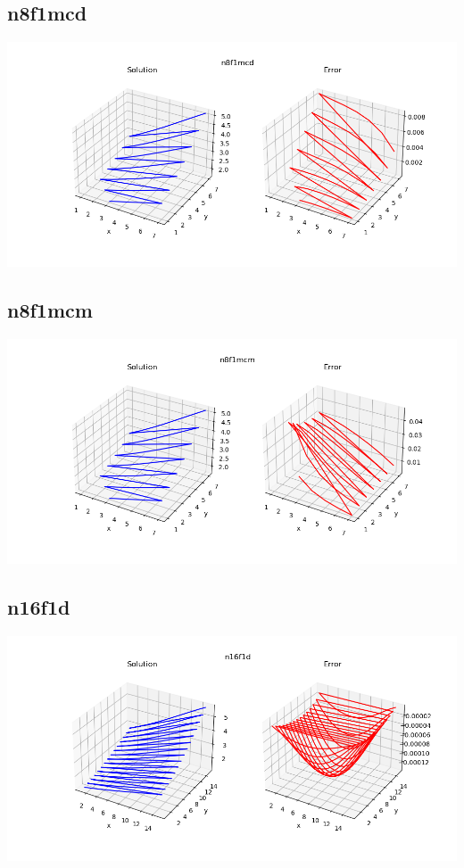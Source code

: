 \subsection*{n8f1mcd}
\includegraphics[scale=0.6]{../../image/n8f1mcd.png}
\subsection*{n8f1mcm}
\includegraphics[scale=0.6]{../../image/n8f1mcm.png}
\subsection*{n16f1d}
\includegraphics[scale=0.6]{../../image/n16f1d.png}
